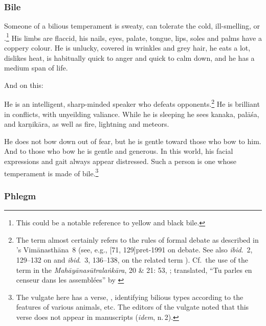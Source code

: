 \begin{translation}
 \subsubsection{Bile}
 
 \item[68]
 
Someone of a bilious temperament is sweaty, can tolerate the cold, ill-smelling,  or .\footnote{This could be a notable reference to yellow and black bile.} His limbs are flaccid, his nails, eyes, palate, tongue, lips, soles and palms have a coppery colour.  He is unlucky, covered in wrinkles and grey hair, he eats a lot, dislikes heat, is habitually quick to anger and quick to calm down, and he has a medium span of life. 
    
\item[69--70]

And on this:
\begin{sloka}
    He is an intelligent, sharp-minded speaker who defeats
opponents.\footnote{The term  almost certainly
    refers to the rules of formal debate as described in \CS's
    Vimānasthāna~8  (see, e.g., [71, 129]{pret-1991} on
    debate.  See also \emph{ibid}.\ 2, 129--132 on
     and \emph{ibid}.\ 3, 136--138, on the related
    term ). Cf.\ the use of the term in the
    \emph{Mahāyānasūtralaṅkāra}, 20 \& 21: 53,
    \parencites[186]{levi-1907}[181]{dvar-1985}; translated, “Tu
    parles en censeur dans les assembl\'ees” by \citet[303]{levi-1907}}
    He is brilliant in conflicts, with unyeilding valiance. While he
    is sleeping he sees \gls{kanaka}, \gls{palāśa}, and
    \gls{karṇikāra}, as well as fire, lightning and meteors.
\end{sloka}
\begin{sloka}
    He does not bow down out of fear, but he is gentle toward those who bow to him.  And to those who bow he is gentle and generous. 
    In this world, his facial expressions and gait always appear distressed. Such a person is one whose temperament is made of bile.\footnote{The vulgate here has a verse, , identifying bilious types according to the features of various animals, etc. The editors of the vulgate noted that this verse does not appear in manuscripts (\emph{idem}, n.\,2).}
\end{sloka}


 \subsubsection{Phlegm}
 

\end{translation}
